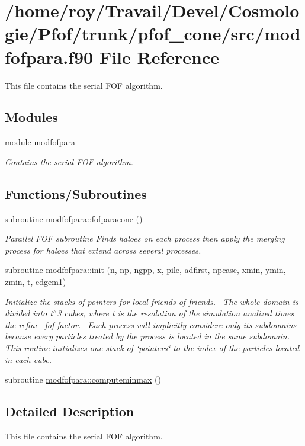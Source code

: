 \hypertarget{pfof__cone_2src_2modfofpara_8f90}{}\section{/home/roy/\+Travail/\+Devel/\+Cosmologie/\+Pfof/trunk/pfof\+\_\+cone/src/modfofpara.f90 File Reference}
\label{pfof__cone_2src_2modfofpara_8f90}


This file contains the serial F\+OF algorithm.  


\subsection*{Modules}
\begin{DoxyCompactItemize}
\item 
module \hyperlink{namespacemodfofpara}{modfofpara}
\begin{DoxyCompactList}\small\item\em Contains the serial F\+OF algorithm. \end{DoxyCompactList}\end{DoxyCompactItemize}
\subsection*{Functions/\+Subroutines}
\begin{DoxyCompactItemize}
\item 
subroutine \hyperlink{namespacemodfofpara_a033a2820dd29f107782b566ca298bde4}{modfofpara\+::fofparacone} ()
\begin{DoxyCompactList}\small\item\em Parallel F\+OF subroutine Finds haloes on each process then apply the merging process for haloes that extend across several processes. \end{DoxyCompactList}\item 
subroutine \hyperlink{namespacemodfofpara_afdd2abc340cad047a13ebbb62f1bafdc}{modfofpara\+::init} (n, np, ngpp, x, pile, adfirst, npcase, xmin, ymin, zmin, t, edgem1)
\begin{DoxyCompactList}\small\item\em Initialize the stacks of pointers for local friends of friends.~\newline
 The whole domain is divided into t$^\wedge$3 cubes, where t is the resolution of the simulation analized times the refine\+\_\+fof factor.~\newline
 Each process will implicitly considere only its subdomains because every particles treated by the process is located in the same subdomain.~\newline
 This routine initializes one stack of \char`\"{}pointers\char`\"{} to the index of the particles located in each cube. \end{DoxyCompactList}\item 
subroutine \hyperlink{namespacemodfofpara_aae8bee067b5066b64d8799e78efa239c}{modfofpara\+::computeminmax} ()
\end{DoxyCompactItemize}


\subsection{Detailed Description}
This file contains the serial F\+OF algorithm. 

